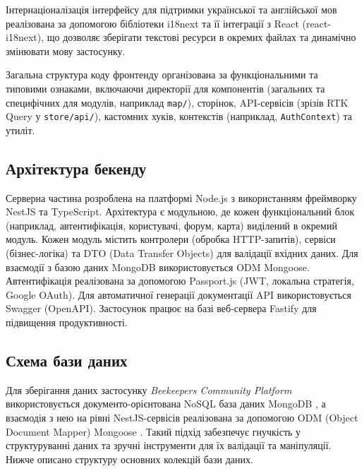 Інтернаціоналізація інтерфейсу для підтримки української та англійської мов реалізована за допомогою бібліотеки i18next \cite{i18next} та її інтеграції з React (react-i18next), що дозволяє зберігати текстові ресурси в окремих файлах та динамічно змінювати мову застосунку.

Загальна структура коду фронтенду організована за функціональними та типовими ознаками, включаючи директорії для компонентів (загальних та специфічних для модулів, наприклад \texttt{map/}), сторінок, API-сервісів (зрізів RTK Query у \texttt{store/api/}), кастомних хуків, контекстів (наприклад, \texttt{AuthContext}) та утиліт.

\subsection{Архітектура бекенду}
Серверна частина розроблена на платформі Node.js з використанням фреймворку NestJS та TypeScript. Архітектура є модульною, де кожен функціональний блок (наприклад, автентифікація, користувачі, форум, карта) виділений в окремий модуль. Кожен модуль містить контролери (обробка HTTP-запитів), сервіси (бізнес-логіка) та DTO (Data Transfer Objects) для валідації вхідних даних. Для взаємодії з базою даних MongoDB використовується ODM Mongoose. Автентифікація реалізована за допомогою Passport.js (JWT, локальна стратегія, Google OAuth). Для автоматичної генерації документації API використовується Swagger (OpenAPI). Застосунок працює на базі веб-сервера Fastify для підвищення продуктивності.

\subsection{Схема бази даних}
\label{subsec:db_schema_detailed}
Для зберігання даних застосунку \textit{Beekeepers Community Platform} використовується документо-орієнтована NoSQL база даних MongoDB \cite{mongodb}, а взаємодія з нею на рівні NestJS-сервісів реалізована за допомогою ODM (Object Document Mapper) Mongoose \cite{mongoose}. Такий підхід забезпечує гнучкість у структуруванні даних та зручні інструменти для їх валідації та маніпуляції. Нижче описано структуру основних колекцій бази даних.

